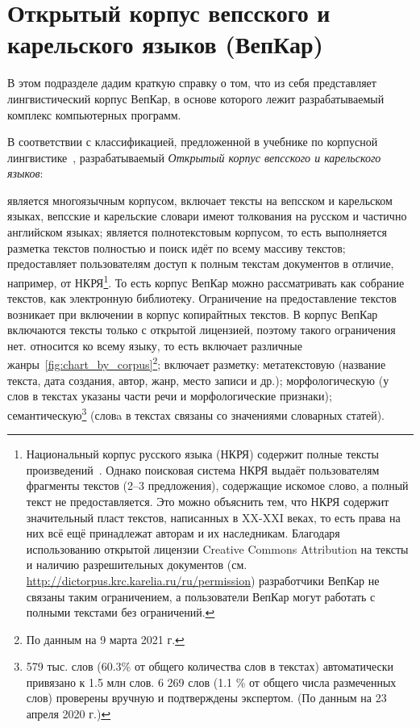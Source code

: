 \section{Открытый корпус вепсского и карельского языков (ВепКар)} \label{sect_VepKar_about}

В этом подразделе дадим краткую справку о том, что из себя представляет 
лингвистический корпус ВепКар, в основе которого лежит 
разрабатываемый комплекс компьютерных программ.

В соответствии с классификацией, предложенной 
в учебнике по корпусной лингвистике~\cite[с.~12]{Zakharov2005}, 
разрабатываемый \emph{Открытый корпус вепсского и карельского языков}: 
\renewcommand{\outlinei}{itemize}
\renewcommand{\outlineii}{itemize}
\begin{outline}
    \1 является многоязычным корпусом, включает тексты на вепсском и карельском языках, вепсские и карельские словари имеют толкования на русском и частично английском языках;
    \1 является полнотекстовым корпусом, то есть выполняется разметка текстов полностью и поиск идёт по всему массиву текстов;
    \1 предоставляет пользователям доступ к полным текстам документов в отличие, 
    например, от НКРЯ\footnote{Национальный 
    корпус русского языка (НКРЯ) содержит 
        полные тексты произведений~\cite[с.~12]{Plungyan2004Sichinava}.  
        Однако поисковая система НКРЯ выдаёт пользователям фрагменты текстов (2--3 предложения), 
        содержащие искомое слово, а полный текст не предоставляется. 
        Это можно объяснить тем, что НКРЯ содержит значительный пласт текстов, 
        написанных в XX-XXI веках, 
        то есть права на них всё ещё принадлежат авторам и их наследникам. 
        Благодаря использованию открытой лицензии Creative Commons Attribution на тексты 
        и наличию разрешительных документов
        (см. \url{http://dictorpus.krc.karelia.ru/ru/permission}) 
        разработчики ВепКар не связаны таким ограничением,  
        а пользователи ВепКар могут работать с полными текстами без ограничений.
    }. То есть корпус ВепКар можно рассматривать как собрание текстов, как электронную библиотеку. Ограничение на предоставление текстов возникает при включении в корпус копирайтных текстов. В корпус ВепКар включаются тексты только с открытой лицензией, поэтому такого ограничения нет.
    \1 относится ко всему языку, то есть включает различные жанры~\ref{fig:chart_by_corpus}\footnote{По данным на 9 марта 2021 г.}; 
    \1 включает разметку:
        \2[\textbullet] метатекстовую (название текста, дата создания, автор, жанр, место записи и др.);
        \2[\textbullet] морфологическую (у слов в текстах указаны части речи и морфологические признаки);
        \2[\textbullet] семантическую\footnote{ 579 тыс. слов (60.3\% от общего количества слов в
         	             текстах) автоматически привязано к 1.5 млн  слов. 6 269 слов (1.1 \% от общего числа размеченных слов) 
         	             проверены вручную и подтверждены экспертом.
                        (По данным на 23 апреля 2020 г.)} (словa в текстах связаны со значениями словарных статей).
\end{outline}

